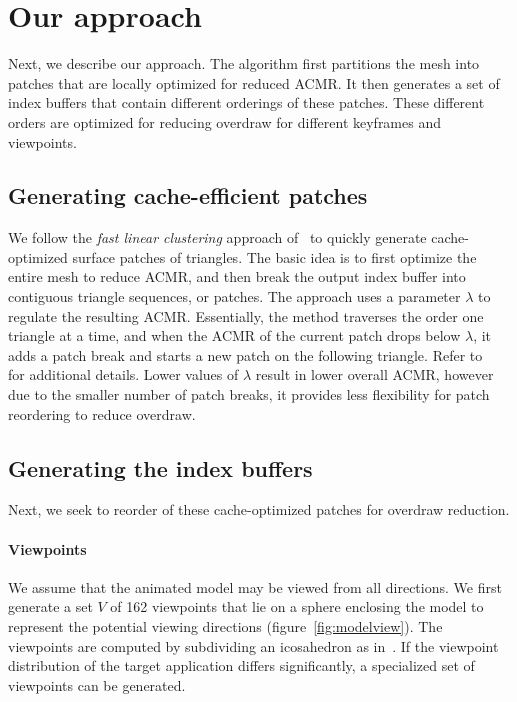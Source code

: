 \section{Our approach}
\label{sec:preproc}

Next, we describe our approach. The algorithm first partitions the mesh into patches that are locally optimized for reduced ACMR.
It then generates a set of index buffers that contain different orderings of these patches. These different orders 
are optimized for reducing overdraw for different keyframes and viewpoints.

\subsection{Generating cache-efficient patches}
We follow the {\em fast linear clustering} approach of~\cite{Sander07} to quickly generate
cache-optimized surface patches of triangles. The basic idea is to first optimize the entire
mesh to reduce ACMR, and then break the output index buffer into contiguous triangle sequences, or patches.
The approach uses a parameter $\lambda$ to regulate the resulting ACMR.
Essentially, the method traverses the order one triangle at a time, and when the ACMR of the current patch 
drops below $\lambda$, it adds a patch break and starts a new patch on the following triangle.
Refer to ~\cite{Sander07} for additional details. 
Lower values of $\lambda$ result in lower overall ACMR, however due to the smaller number of patch breaks, it 
provides less flexibility for patch reordering to reduce overdraw.

\subsection{Generating the index buffers}
Next, we seek to reorder of these cache-optimized patches for overdraw reduction.

\paragraph{Viewpoints}
We assume that the animated model may be viewed from all directions. We first generate a set $V$ of 162 viewpoints that lie on a sphere enclosing the model to represent the potential viewing directions (figure~\ref{fig:modelview}). The viewpoints are computed by subdividing an icosahedron as in~\cite{Nehab06}.  If the viewpoint distribution of the target application differs significantly, a specialized set of viewpoints can be generated.

